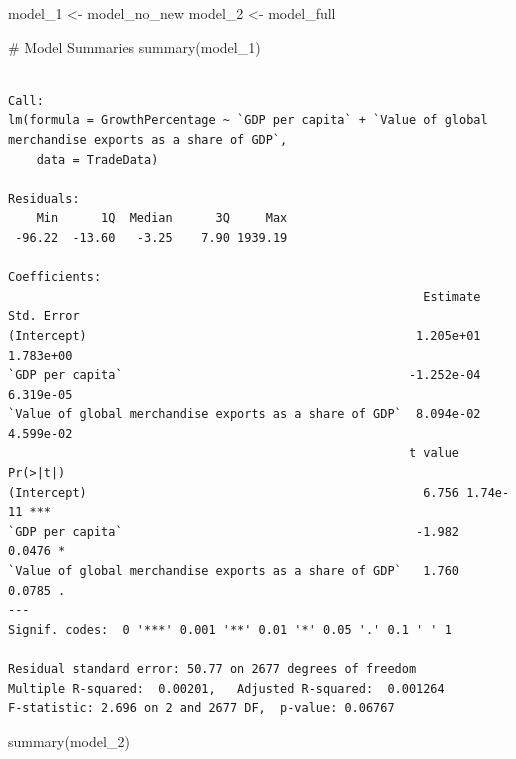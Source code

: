 \documentclass[
  10pt,
]{article}
\newenvironment{Shaded}{\begin{snugshade}}{\end{snugshade}}
\newcommand{\CommentTok}[1]{\textcolor[rgb]{0.37,0.37,0.37}{#1}}
\newcommand{\FunctionTok}[1]{\textcolor[rgb]{0.28,0.35,0.67}{#1}}
\newcommand{\NormalTok}[1]{\textcolor[rgb]{0.00,0.23,0.31}{#1}}
\newcommand{\OtherTok}[1]{\textcolor[rgb]{0.00,0.23,0.31}{#1}}
\begin{document}
\begin{Shaded}
\begin{Highlighting}[]
\NormalTok{model\_1 }\OtherTok{\textless{}{-}}\NormalTok{ model\_no\_new}
\NormalTok{model\_2 }\OtherTok{\textless{}{-}}\NormalTok{ model\_full}

\CommentTok{\# Model Summaries}
\FunctionTok{summary}\NormalTok{(model\_1)}
\end{Highlighting}
\end{Shaded}

\begin{verbatim}

Call:
lm(formula = GrowthPercentage ~ `GDP per capita` + `Value of global merchandise exports as a share of GDP`, 
    data = TradeData)

Residuals:
    Min      1Q  Median      3Q     Max 
 -96.22  -13.60   -3.25    7.90 1939.19 

Coefficients:
                                                          Estimate Std. Error
(Intercept)                                              1.205e+01  1.783e+00
`GDP per capita`                                        -1.252e-04  6.319e-05
`Value of global merchandise exports as a share of GDP`  8.094e-02  4.599e-02
                                                        t value Pr(>|t|)    
(Intercept)                                               6.756 1.74e-11 ***
`GDP per capita`                                         -1.982   0.0476 *  
`Value of global merchandise exports as a share of GDP`   1.760   0.0785 .  
---
Signif. codes:  0 '***' 0.001 '**' 0.01 '*' 0.05 '.' 0.1 ' ' 1

Residual standard error: 50.77 on 2677 degrees of freedom
Multiple R-squared:  0.00201,   Adjusted R-squared:  0.001264 
F-statistic: 2.696 on 2 and 2677 DF,  p-value: 0.06767
\end{verbatim}

\begin{Shaded}
\begin{Highlighting}[]
\FunctionTok{summary}\NormalTok{(model\_2)}
\end{Highlighting}
\end{Shaded}
\end{document}
